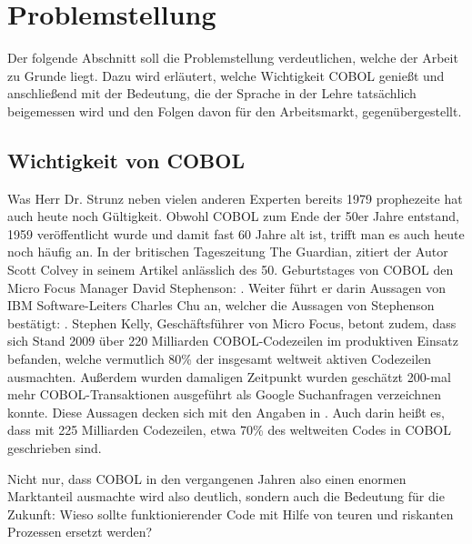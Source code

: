 \section{Problemstellung}\label{problemstellung}
Der folgende Abschnitt soll die Problemstellung verdeutlichen, welche der Arbeit zu Grunde liegt. 
Dazu wird erläutert, welche Wichtigkeit COBOL genießt und anschließend mit der Bedeutung, die der Sprache in der Lehre tatsächlich beigemessen wird und den Folgen davon für den Arbeitsmarkt, gegenübergestellt.

\subsection*{Wichtigkeit von COBOL}\label{wichtigkeit}
 \cite{_ist_1979}

Was Herr Dr. Strunz neben vielen anderen Experten bereits 1979 prophezeite hat auch heute noch Gültigkeit. Obwohl COBOL zum Ende der 50er Jahre entstand, 1959 veröffentlicht wurde und damit fast 60 Jahre alt ist, trifft man es auch heute noch häufig an. In der britischen Tageszeitung The Guardian, zitiert der Autor Scott Colvey in seinem Artikel %
\cite{colvey_cobol_2009} anlässlich des 50. Geburtstages von COBOL den Micro Focus Manager David Stephenson: . 
Weiter führt er darin Aussagen von IBM Software-Leiters Charles Chu an, welcher die Aussagen von Stephenson bestätigt: . 
Stephen Kelly, Geschäftsführer von Micro Focus, betont zudem, dass sich Stand 2009 über 220 Milliarden COBOL-Codezeilen im produktiven Einsatz befanden, welche vermutlich 80\% der insgesamt weltweit aktiven Codezeilen ausmachten. Außerdem wurden damaligen Zeitpunkt wurden geschätzt 200-mal mehr COBOL-Transaktionen ausgeführt als Google Suchanfragen verzeichnen konnte. \cite{kelly_cobol_2009} Diese Aussagen decken sich mit den Angaben in . Auch darin heißt es, dass mit 225 Milliarden Codezeilen, etwa 70\% des weltweiten Codes in COBOL geschrieben sind.

Nicht nur, dass COBOL in den vergangenen Jahren also einen enormen Marktanteil ausmachte wird also deutlich, sondern auch die Bedeutung für die Zukunft: Wieso sollte funktionierender Code mit Hilfe von teuren und riskanten Prozessen ersetzt werden?

